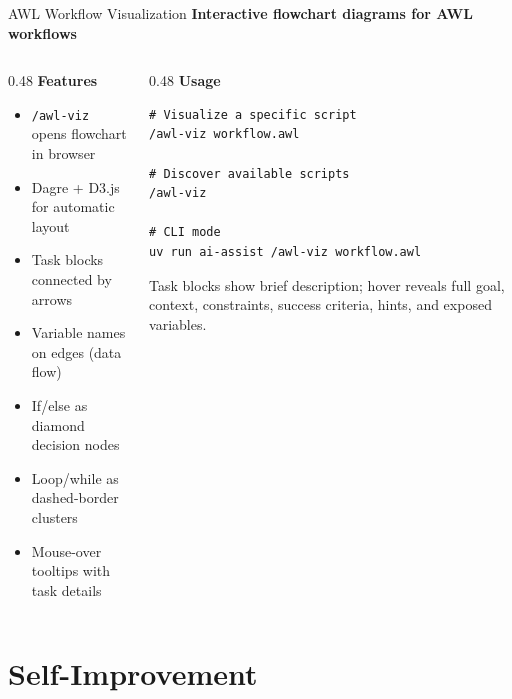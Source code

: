 \documentclass[aspectratio=169,10pt]{beamer}
\begin{document}
\begin{frame}[fragile]{AWL Workflow Visualization}
\textbf{Interactive flowchart diagrams for AWL workflows}

\medskip
\begin{columns}[T]
\begin{column}{0.48\textwidth}
\textbf{Features}
\begin{itemize}\scriptsize\setlength{\itemsep}{1pt}
  \item \texttt{/awl-viz} opens flowchart in browser
  \item Dagre + D3.js for automatic layout
  \item Task blocks connected by arrows
  \item \alert{Variable names} on edges (data flow)
  \item If/else as diamond decision nodes
  \item Loop/while as dashed-border clusters
  \item Mouse-over tooltips with task details
\end{itemize}
\end{column}
\begin{column}{0.48\textwidth}
\textbf{Usage}
\begin{lstlisting}[style=code,language={}]
# Visualize a specific script
/awl-viz workflow.awl

# Discover available scripts
/awl-viz

# CLI mode
uv run ai-assist /awl-viz workflow.awl
\end{lstlisting}

\medskip
{\scriptsize\color{gray}
Task blocks show brief description; hover reveals full goal, context, constraints, success criteria, hints, and exposed variables.}
\end{column}
\end{columns}
\end{frame}

\section{Self-Improvement}
\end{document}
